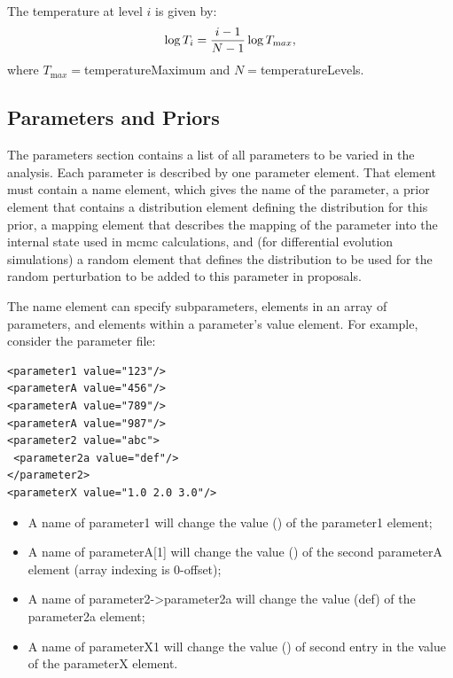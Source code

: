 The temperature at level $i$ is given by:
\begin{equation}
\log T_i = {i-1 \over N-1} \log T_{\mathrm max},
\end{equation}
where $T_{\mathrm max}=${\normalfont \ttfamily temperatureMaximum} and $N=${\normalfont \ttfamily temperatureLevels}.

\subsection{Parameters and Priors}\label{sec:ParametersPriors}

The {\normalfont \ttfamily parameters} section contains a list of all parameters to be varied in the analysis. Each parameter is described by one {\normalfont \ttfamily parameter} element. That element must contain a {\normalfont \ttfamily name} element, which gives the name of the parameter, a {\normalfont \ttfamily prior} element that contains a {\normalfont \ttfamily distribution} element defining the distribution for this prior, a {\normalfont \ttfamily mapping} element that describes the mapping of the parameter into the internal state used in \gls{mcmc} calculations, and (for differential evolution simulations) a {\normalfont \ttfamily random} element that defines the distribution to be used for the random perturbation to be added to this parameter in proposals.

The {\normalfont \ttfamily name} element can specify subparameters, elements in an array of parameters, and elements within a parameter's {\normalfont \ttfamily value} element. For example, consider the parameter file:
\begin{verbatim}
<parameter1 value="123"/>
<parameterA value="456"/>
<parameterA value="789"/>
<parameterA value="987"/>
<parameter2 value="abc">
 <parameter2a value="def"/>
</parameter2>
<parameterX value="1.0 2.0 3.0"/>
\end{verbatim}
\begin{itemize}
\item A name of {\normalfont \ttfamily parameter1} will change the value ({\normalfont {}}) of the {\normalfont \ttfamily parameter1} element;
\item A name of {\normalfont \ttfamily parameterA[1]} will change the value ({\normalfont {}}) of the second {\normalfont \ttfamily parameterA} element (array indexing is 0-offset);
\item A name of {\normalfont \ttfamily parameter2->parameter2a} will change the value ({\normalfont \ttfamily def}) of the {\normalfont \ttfamily parameter2a} element;
\item A name of {\normalfont \ttfamily parameterX{1}} will change the value ({\normalfont {}}) of second entry in the value of the {\normalfont \ttfamily parameterX} element.
\end{itemize}

